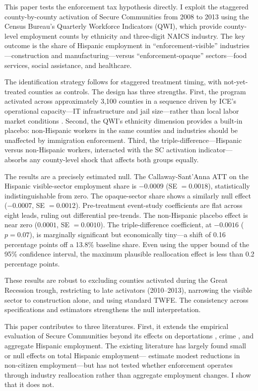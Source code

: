 \documentclass[12pt]{article}
\begin{document}
This paper tests the enforcement tax hypothesis directly. I exploit the staggered county-by-county activation of Secure Communities from 2008 to 2013 using the Census Bureau's Quarterly Workforce Indicators (QWI), which provide county-level employment counts by ethnicity and three-digit NAICS industry. The key outcome is the share of Hispanic employment in ``enforcement-visible'' industries---construction and manufacturing---versus ``enforcement-opaque'' sectors---food services, social assistance, and healthcare.

The identification strategy follows \citet{callaway2021difference} for staggered treatment timing, with not-yet-treated counties as controls. The design has three strengths. First, the program activated across approximately 3,100 counties in a sequence driven by ICE's operational capacity---IT infrastructure and jail size---rather than local labor market conditions \citep{east2023labor}. Second, the QWI's ethnicity dimension provides a built-in placebo: non-Hispanic workers in the same counties and industries should be unaffected by immigration enforcement. Third, the triple-difference---Hispanic versus non-Hispanic workers, interacted with the SC activation indicator---absorbs any county-level shock that affects both groups equally.

The results are a precisely estimated null. The Callaway-Sant'Anna ATT on the Hispanic visible-sector employment share is $-0.0009$ (SE $= 0.0018$), statistically indistinguishable from zero. The opaque-sector share shows a similarly null effect ($-0.0007$, SE $= 0.0012$). Pre-treatment event-study coefficients are flat across eight leads, ruling out differential pre-trends. The non-Hispanic placebo effect is near zero ($0.0001$, SE $= 0.0010$). The triple-difference coefficient, at $-0.0016$ ($p = 0.07$), is marginally significant but economically tiny---a shift of 0.16 percentage points off a 13.8\% baseline share. Even using the upper bound of the 95\% confidence interval, the maximum plausible reallocation effect is less than 0.2 percentage points.

These results are robust to excluding counties activated during the Great Recession trough, restricting to late activators (2010--2013), narrowing the visible sector to construction alone, and using standard TWFE. The consistency across specifications and estimators strengthens the null interpretation.

This paper contributes to three literatures. First, it extends the empirical evaluation of Secure Communities beyond its effects on deportations \citep{cox2014policing, miles2014does}, crime \citep{east2023labor}, and aggregate Hispanic employment. The existing literature has largely found small or null effects on total Hispanic employment---\citet{east2023labor} estimate modest reductions in non-citizen employment---but has not tested whether enforcement operates through industry reallocation rather than aggregate employment changes. I show that it does not.
\end{document}
